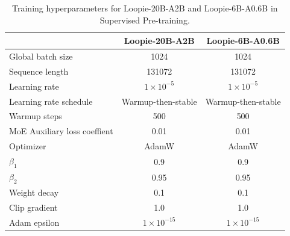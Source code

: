 \newpage
{}
\begin{table}[!htbp]
\centering
\caption{Training hyperparameters for Loopie-20B-A2B and Loopie-6B-A0.6B in Supervised Pre-training.}
\vspace{2pt}
{\small
\setlength{\tabcolsep}{20pt}
\renewcommand{\arraystretch}{1.5}
\begin{tabular}{l|cc}
\toprule
 & Loopie-20B-A2B & Loopie-6B-A0.6B  \\
\midrule
Global batch size & 1024  & 1024 \\
Sequence length & 131072 & 131072 \\
Learning rate & $1\times10^{-5}$  & $1\times10^{-5}$  \\
Learning rate schedule & Warmup-then-stable & Warmup-then-stable  \\
Warmup steps & 500 & 500 \\
MoE Auxiliary loss coeffient & 0.01 & 0.01 \\
Optimizer & AdamW  & AdamW \\
$\beta_1$ & 0.9 & 0.9  \\
$\beta_2$ & 0.95 & 0.95 \\
Weight decay & 0.1  & 0.1 \\
Clip gradient & 1.0  & 1.0 \\
Adam epsilon & $1\times10^{-15}$ & $1\times10^{-15}$ \\
\bottomrule
\end{tabular}
}
\label{tab:spt_details}
\end{table}




